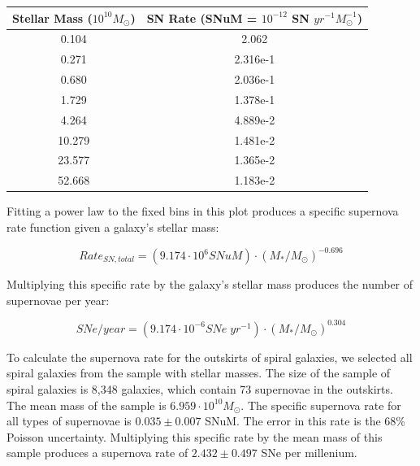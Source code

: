 \documentclass[apj]{emulateapj}
\begin{document}
\begin{table}

\begin{center}

  
  \begin{tabular}{| c | c |}
  \hline
    Stellar Mass ($10^{10} M_{\odot}$) & SN Rate \newline (SNuM = $10^{-12}$ SN $yr^{-1} M_{\odot}^{-1}$) \\
  \hline
    0.104 & 2.062 \\
    0.271 & 2.316e-1 \\
    0.680 & 2.036e-1 \\
    1.729 & 1.378e-1 \\
    4.264 & 4.889e-2 \\
    10.279 & 1.481e-2 \\
    23.577 & 1.365e-2 \\
    52.668 & 1.183e-2 \\
  \hline
  \end{tabular}
\end{center}

\end{table}

Fitting a power law to the fixed bins in this plot produces a specific supernova rate function given a galaxy's stellar mass:

\begin{equation}
Rate_{SN,total}=(9.174 \cdot 10^6 SNuM) \cdot (M_*/M_{\odot})^{-0.696}
\end{equation}

Multiplying this specific rate by the galaxy's stellar mass produces the number of supernovae per year:

\begin{equation}
SNe/year=(9.174 \cdot 10^{-6} SNe\;yr^{-1}) \cdot (M_*/M_{\odot})^{0.304}
\end{equation}

To calculate the supernova rate for the outskirts of spiral galaxies, we selected all spiral galaxies from the sample with stellar masses. The size of the sample of spiral galaxies is 8,348 galaxies, which contain 73 supernovae in the outskirts. The mean mass of the sample is $6.959 \cdot 10^{10} M_{\odot}$. The specific supernova rate for all types of supernovae is $0.035 \pm 0.007$ SNuM. The error in this rate is the 68\% Poisson uncertainty. Multiplying this specific rate by the mean mass of this sample produces a supernova rate of $2.432 \pm 0.497$ SNe per millenium.
\end{document}
